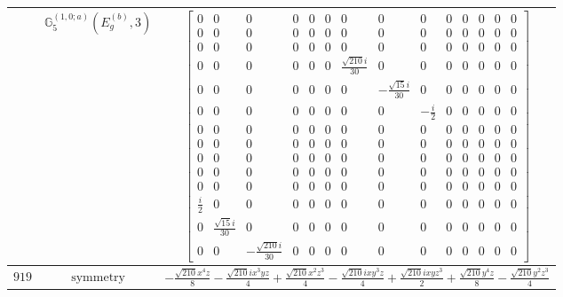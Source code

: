 \documentclass[fleqn,8pt,landscape]{jsarticle}
\begin{document}
\begin{longtable}{ccc}
$  $ & $ \mathbb{G}_{5}^{(1,0;a)}(E_{g}^{(b)},3) $ & $ \begin{bmatrix} 0 & 0 & 0 & 0 & 0 & 0 & 0 & 0 & 0 & 0 & 0 & 0 & 0 & 0 \\ 0 & 0 & 0 & 0 & 0 & 0 & 0 & 0 & 0 & 0 & 0 & 0 & 0 & 0 \\ 0 & 0 & 0 & 0 & 0 & 0 & 0 & 0 & 0 & 0 & 0 & 0 & 0 & 0 \\ 0 & 0 & 0 & 0 & 0 & 0 & \frac{\sqrt{210} i}{30} & 0 & 0 & 0 & 0 & 0 & 0 & 0 \\ 0 & 0 & 0 & 0 & 0 & 0 & 0 & - \frac{\sqrt{15} i}{30} & 0 & 0 & 0 & 0 & 0 & 0 \\ 0 & 0 & 0 & 0 & 0 & 0 & 0 & 0 & - \frac{i}{2} & 0 & 0 & 0 & 0 & 0 \\ 0 & 0 & 0 & 0 & 0 & 0 & 0 & 0 & 0 & 0 & 0 & 0 & 0 & 0 \\ 0 & 0 & 0 & 0 & 0 & 0 & 0 & 0 & 0 & 0 & 0 & 0 & 0 & 0 \\ 0 & 0 & 0 & 0 & 0 & 0 & 0 & 0 & 0 & 0 & 0 & 0 & 0 & 0 \\ 0 & 0 & 0 & 0 & 0 & 0 & 0 & 0 & 0 & 0 & 0 & 0 & 0 & 0 \\ 0 & 0 & 0 & 0 & 0 & 0 & 0 & 0 & 0 & 0 & 0 & 0 & 0 & 0 \\ \frac{i}{2} & 0 & 0 & 0 & 0 & 0 & 0 & 0 & 0 & 0 & 0 & 0 & 0 & 0 \\ 0 & \frac{\sqrt{15} i}{30} & 0 & 0 & 0 & 0 & 0 & 0 & 0 & 0 & 0 & 0 & 0 & 0 \\ 0 & 0 & - \frac{\sqrt{210} i}{30} & 0 & 0 & 0 & 0 & 0 & 0 & 0 & 0 & 0 & 0 & 0 \end{bmatrix} $ \\ \hline
$ 919 $ & $ \text{symmetry} $ & $ - \frac{\sqrt{210} x^{4} z}{8} - \frac{\sqrt{210} i x^{3} y z}{4} + \frac{\sqrt{210} x^{2} z^{3}}{4} - \frac{\sqrt{210} i x y^{3} z}{4} + \frac{\sqrt{210} i x y z^{3}}{2} + \frac{\sqrt{210} y^{4} z}{8} - \frac{\sqrt{210} y^{2} z^{3}}{4} $ \\

\end{longtable}
\end{document}
